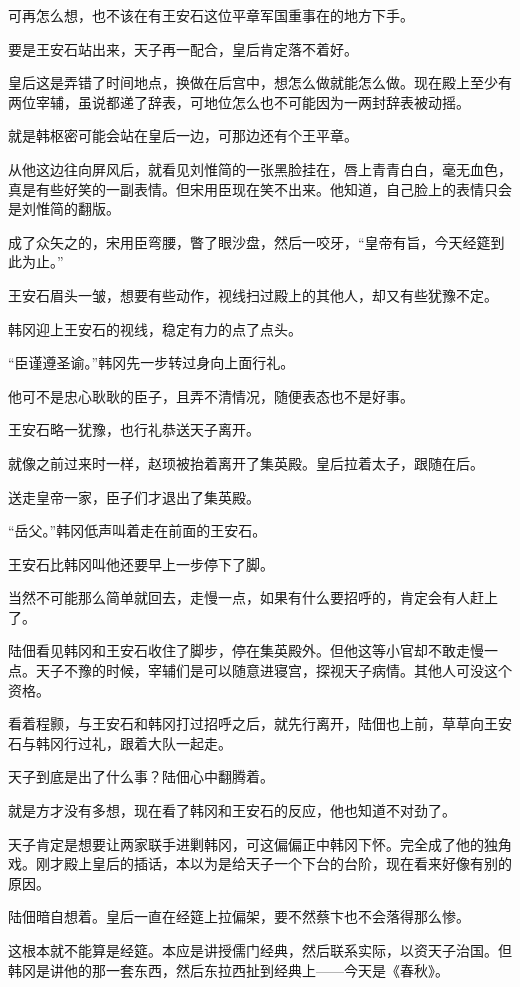 可再怎么想，也不该在有王安石这位平章军国重事在的地方下手。

要是王安石站出来，天子再一配合，皇后肯定落不着好。

皇后这是弄错了时间地点，换做在后宫中，想怎么做就能怎么做。现在殿上至少有两位宰辅，虽说都递了辞表，可地位怎么也不可能因为一两封辞表被动摇。

就是韩枢密可能会站在皇后一边，可那边还有个王平章。

从他这边往向屏风后，就看见刘惟简的一张黑脸挂在，唇上青青白白，毫无血色，真是有些好笑的一副表情。但宋用臣现在笑不出来。他知道，自己脸上的表情只会是刘惟简的翻版。

成了众矢之的，宋用臣弯腰，瞥了眼沙盘，然后一咬牙，“皇帝有旨，今天经筵到此为止。”

王安石眉头一皱，想要有些动作，视线扫过殿上的其他人，却又有些犹豫不定。

韩冈迎上王安石的视线，稳定有力的点了点头。

“臣谨遵圣谕。”韩冈先一步转过身向上面行礼。

他可不是忠心耿耿的臣子，且弄不清情况，随便表态也不是好事。

王安石略一犹豫，也行礼恭送天子离开。

就像之前过来时一样，赵顼被抬着离开了集英殿。皇后拉着太子，跟随在后。

送走皇帝一家，臣子们才退出了集英殿。

“岳父。”韩冈低声叫着走在前面的王安石。

王安石比韩冈叫他还要早上一步停下了脚。

当然不可能那么简单就回去，走慢一点，如果有什么要招呼的，肯定会有人赶上了。

陆佃看见韩冈和王安石收住了脚步，停在集英殿外。但他这等小官却不敢走慢一点。天子不豫的时候，宰辅们是可以随意进寝宫，探视天子病情。其他人可没这个资格。

看着程颢，与王安石和韩冈打过招呼之后，就先行离开，陆佃也上前，草草向王安石与韩冈行过礼，跟着大队一起走。

天子到底是出了什么事？陆佃心中翻腾着。

就是方才没有多想，现在看了韩冈和王安石的反应，他也知道不对劲了。

天子肯定是想要让两家联手进剿韩冈，可这偏偏正中韩冈下怀。完全成了他的独角戏。刚才殿上皇后的插话，本以为是给天子一个下台的台阶，现在看来好像有别的原因。

陆佃暗自想着。皇后一直在经筵上拉偏架，要不然蔡卞也不会落得那么惨。

这根本就不能算是经筵。本应是讲授儒门经典，然后联系实际，以资天子治国。但韩冈是讲他的那一套东西，然后东拉西扯到经典上——今天是《春秋》。

